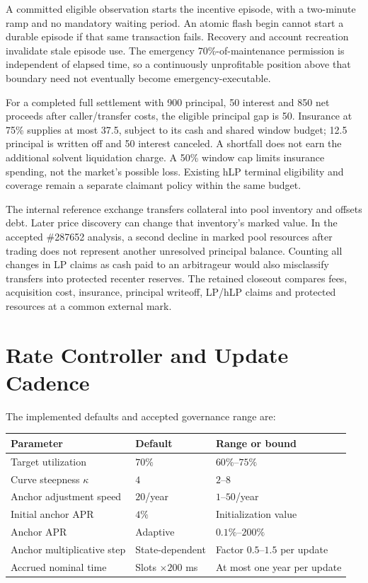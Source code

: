 A committed eligible observation starts the incentive episode, with a two-minute ramp and no mandatory waiting period. An atomic flash begin cannot start a durable episode if that same transaction fails. Recovery and account recreation invalidate stale episode use. The emergency 70\%-of-maintenance permission is independent of elapsed time, so a continuously unprofitable position above that boundary need not eventually become emergency-executable.

For a completed full settlement with 900 principal, 50 interest and 850 net proceeds after caller/transfer costs, the eligible principal gap is 50. Insurance at 75\% supplies at most 37.5, subject to its cash and shared window budget; 12.5 principal is written off and 50 interest canceled. A shortfall does not earn the additional solvent liquidation charge. A 50\% window cap limits insurance spending, not the market's possible loss. Existing hLP terminal eligibility and coverage remain a separate claimant policy within the same budget.

The internal reference exchange transfers collateral into pool inventory and offsets debt. Later price discovery can change that inventory's marked value. In the accepted \#287652 analysis, a second decline in marked pool resources after trading does not represent another unresolved principal balance. Counting all changes in LP claims as cash paid to an arbitrageur would also misclassify transfers into protected recenter reserves. The retained closeout compares fees, acquisition cost, insurance, principal writeoff, LP/hLP claims and protected resources at a common external mark.

\section{Rate Controller and Update Cadence}
\label{app:rates}

The implemented defaults and accepted governance range are:
\begin{center}
\begin{tabular}{@{}lll@{}}
\toprule
Parameter & Default & Range or bound \\
\midrule
Target utilization & $70\%$ & $60\%$--$75\%$ \\
Curve steepness $\kappa$ & $4$ & $2$--$8$ \\
Anchor adjustment speed & $20$/year & $1$--$50$/year \\
Initial anchor APR & $4\%$ & Initialization value \\
Anchor APR & Adaptive & $0.1\%$--$200\%$ \\
Anchor multiplicative step & State-dependent & Factor $0.5$--$1.5$ per update \\
Accrued nominal time & Slots $\times200$ ms & At most one year per update \\
\bottomrule
\end{tabular}
\end{center}

